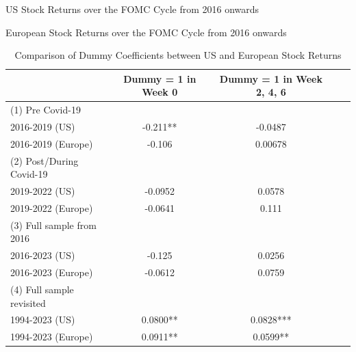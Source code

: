 

\begin{table}[h]
\begin{center}
\begin{adjustbox}{width=1\textwidth}

\end{tabular}
}
\end{adjustbox}
\caption{\label{table_3} US Stock Returns over the FOMC Cycle from 2016 onwards}
\end{center}
\end{table}


\begin{table}[h]
\begin{center}
\begin{adjustbox}{width=1\textwidth}

\end{tabular}
}
\end{adjustbox}
\caption{\label{table_4} European Stock Returns over the FOMC Cycle from 2016 onwards}
\end{center}
\end{table}

\begin{table}[h]
    \centering
    \caption{Comparison of Dummy Coefficients between US and European Stock Returns}
    \label{table:dummy_comparison}
    \begin{tabular}{l|cccc}
        \toprule
        & Dummy = 1 in Week 0 & Dummy = 1 in Week 2, 4, 6 \\
        \midrule
         (1) Pre Covid-19 &&\\
         2016-2019 (US) & -0.211** & -0.0487 \\
         2016-2019 (Europe) & -0.106 & 0.00678  \\
         \addlinespace
        (2) Post/During Covid-19&&\\
        2019-2022 (US) & -0.0952 & 0.0578 \\
        2019-2022 (Europe) & -0.0641 & 0.111 \\
            \addlinespace
        (3) Full sample from 2016&&\\
        2016-2023 (US) & -0.125 & 0.0256 \\
        2016-2023 (Europe) & -0.0612 & 0.0759 \\
          \addlinespace
        (4) Full sample revisited&&\\
        1994-2023 (US) & 0.0800** & 0.0828***  \\
        1994-2023 (Europe) & 0.0911**& 0.0599** \\
        \bottomrule
    \end{tabular}
\end{table}

